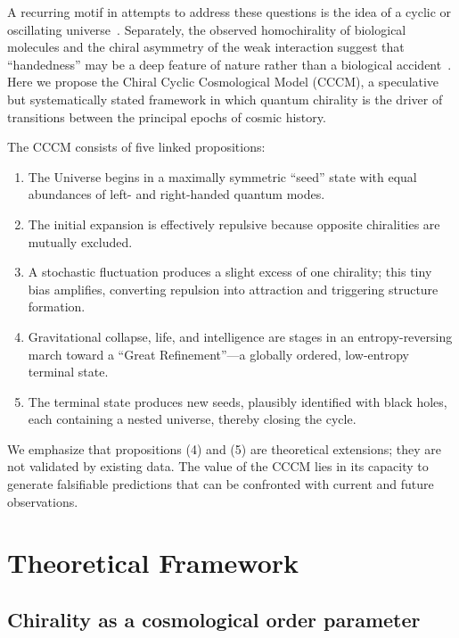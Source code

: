 \documentclass[a4paper,11pt]{article}
\newcommand{\CCCM}{CCCM}
\begin{document}
A recurring motif in attempts to address these questions is the idea of a cyclic or oscillating universe~\cite{Steinhardt2002,Penrose2010}. Separately, the observed homochirality of biological molecules and the chiral asymmetry of the weak interaction suggest that ``handedness'' may be a deep feature of nature rather than a biological accident~\cite{Glashow1961,Hazen2007}. Here we propose the Chiral Cyclic Cosmological Model (\CCCM), a speculative but systematically stated framework in which quantum chirality is the driver of transitions between the principal epochs of cosmic history.

The \CCCM{} consists of five linked propositions:
\begin{enumerate}[label=(\arabic*)]
    \item The Universe begins in a maximally symmetric ``seed'' state with equal abundances of left- and right-handed quantum modes.
    \item The initial expansion is effectively repulsive because opposite chiralities are mutually excluded.
    \item A stochastic fluctuation produces a slight excess of one chirality; this tiny bias amplifies, converting repulsion into attraction and triggering structure formation.
    \item Gravitational collapse, life, and intelligence are stages in an entropy-reversing march toward a ``Great Refinement''---a globally ordered, low-entropy terminal state.
    \item The terminal state produces new seeds, plausibly identified with black holes, each containing a nested universe, thereby closing the cycle.
\end{enumerate}

We emphasize that propositions (4) and (5) are theoretical extensions; they are not validated by existing data. The value of the \CCCM{} lies in its capacity to generate falsifiable predictions that can be confronted with current and future observations.

\section{Theoretical Framework}
\label{sec:theory}

\subsection{Chirality as a cosmological order parameter}
\end{document}
